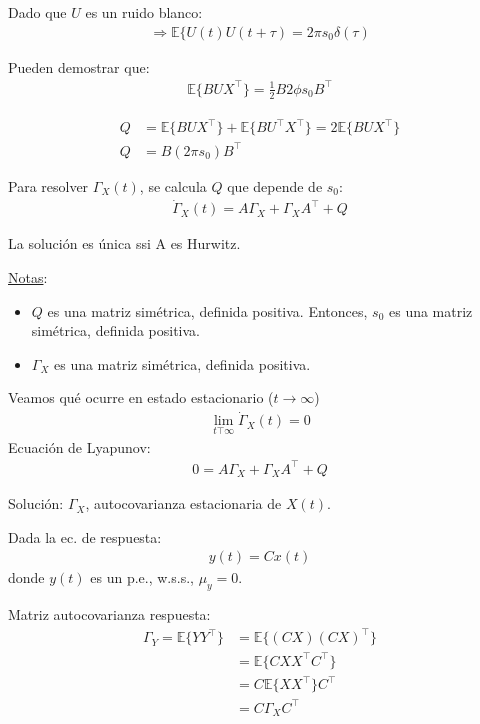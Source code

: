 Dado que $U$ es un ruido blanco:
\begin{align*}
    \Longrightarrow \mathbb{E}\{U(t)U(t+\tau)=2\pi s_0 \delta (\tau)
\end{align*}

Pueden demostrar que:
\begin{align*}
    \mathbb{E}\{BUX^\top \}=\frac{1}{2}B2\phi s_0B^\top
\end{align*}

\begin{align*}
    Q &= \mathbb{E}\{BUX^\top \}+\mathbb{E}\{BU^\top X^\top \}=2\mathbb{E}\{BUX^\top \}\\
    Q &= B(2\pi s_0)B^\top
\end{align*}

Para resolver $\Gamma_X(t)$, se calcula $Q$ que depende de $s_0$:
\begin{align*}
    \dot{\Gamma}_X(t)=A\Gamma_X+\Gamma_XA^\top +Q
\end{align*}

La solución es única ssi A es Hurwitz.\\
\par \underline{Notas}:
\begin{itemize}
    \item $Q$ es una matriz simétrica, definida positiva. Entonces, $s_0$ es una matriz simétrica, definida positiva.
    \item $\Gamma_X$ es una matriz simétrica, definida positiva.
\end{itemize}

Veamos qué ocurre en estado estacionario ($t\to \infty$)
\begin{align*}
    \lim_{t\top \infty} \dot{\Gamma}_X(t)=0
\end{align*}
Ecuación de Lyapunov:
\begin{align*}
   0=A\Gamma_X+\Gamma_XA^\top +Q
\end{align*}

Solución: $\Gamma_X$, autocovarianza estacionaria de $X(t)$.\\

\par Dada la ec. de respuesta:
\begin{align*}
    y(t) = Cx(t)
\end{align*}
donde $y(t)$ es un p.e., w.s.s., $\mu_y=0$.\\
\par Matriz autocovarianza respuesta:
\begin{align*}
    \Gamma_Y=\mathbb{E}\{YY^\top\} &= \mathbb{E}\{(CX)(CX)^\top\}\\
     &= \mathbb{E}\{CXX^\top C^\top\}\\
      &= C \mathbb{E}\{XX^\top\}C^\top\\
       &= C \Gamma_X C^\top\\
\end{align*}



